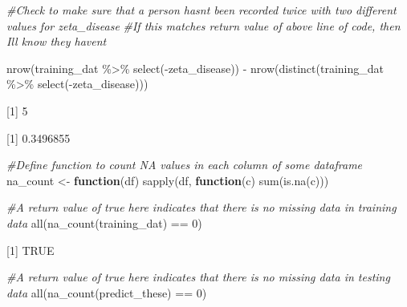 \documentclass[
]{article}
\newenvironment{Shaded}{\begin{snugshade}}{\end{snugshade}}
\newcommand{\CommentTok}[1]{\textcolor[rgb]{0.56,0.35,0.01}{\textit{#1}}}
\newcommand{\ControlFlowTok}[1]{\textcolor[rgb]{0.13,0.29,0.53}{\textbf{#1}}}
\newcommand{\DecValTok}[1]{\textcolor[rgb]{0.00,0.00,0.81}{#1}}
\newcommand{\FunctionTok}[1]{\textcolor[rgb]{0.00,0.00,0.00}{#1}}
\newcommand{\NormalTok}[1]{#1}
\newcommand{\OtherTok}[1]{\textcolor[rgb]{0.56,0.35,0.01}{#1}}
\newcommand{\SpecialCharTok}[1]{\textcolor[rgb]{0.00,0.00,0.00}{#1}}
\begin{document}
\begin{Shaded}
\begin{Highlighting}[]
\CommentTok{\#Check to make sure that a person hasn\textquotesingle{}t been recorded twice with two different values for zeta\_disease}
\CommentTok{\#If this matches return value of above line of code, then I\textquotesingle{}ll know they haven\textquotesingle{}t}

\FunctionTok{nrow}\NormalTok{(training\_dat }\SpecialCharTok{\%\textgreater{}\%} \FunctionTok{select}\NormalTok{(}\SpecialCharTok{{-}}\NormalTok{zeta\_disease)) }\SpecialCharTok{{-}} \FunctionTok{nrow}\NormalTok{(}\FunctionTok{distinct}\NormalTok{(training\_dat }\SpecialCharTok{\%\textgreater{}\%} \FunctionTok{select}\NormalTok{(}\SpecialCharTok{{-}}\NormalTok{zeta\_disease)))}
\end{Highlighting}
\end{Shaded}

{[}1{]} 5

\begin{Shaded}
\end{Shaded}

{[}1{]} 0.3496855

\begin{Shaded}
\begin{Highlighting}[]
\CommentTok{\#Define function to count NA values in each column of some dataframe}
\NormalTok{na\_count }\OtherTok{\textless{}{-}} \ControlFlowTok{function}\NormalTok{(df) }\FunctionTok{sapply}\NormalTok{(df, }\ControlFlowTok{function}\NormalTok{(c) }\FunctionTok{sum}\NormalTok{(}\FunctionTok{is.na}\NormalTok{(c)))}

\CommentTok{\#A return value of true here indicates that there is no missing data in training data}
\FunctionTok{all}\NormalTok{(}\FunctionTok{na\_count}\NormalTok{(training\_dat) }\SpecialCharTok{==} \DecValTok{0}\NormalTok{)}
\end{Highlighting}
\end{Shaded}

{[}1{]} TRUE

\begin{Shaded}
\begin{Highlighting}[]
\CommentTok{\#A return value of true here indicates that there is no missing data in testing data}
\FunctionTok{all}\NormalTok{(}\FunctionTok{na\_count}\NormalTok{(predict\_these) }\SpecialCharTok{==} \DecValTok{0}\NormalTok{)}
\end{Highlighting}
\end{Shaded}
\end{document}
